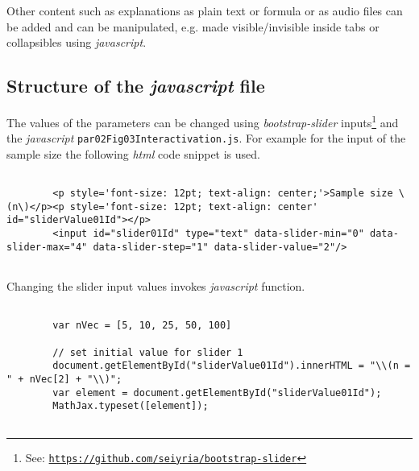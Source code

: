 \documentclass[12pt]{article}
\begin{document}
Other content such as explanations as plain text or formula or as audio files can be added and can be manipulated, e.g. made visible/invisible inside tabs or collapsibles using \emph{javascript}. 






\subsection{Structure of the \emph{javascript} file}\label{SecHowJs}

The values of the parameters can be changed using \emph{bootstrap-slider} inputs\footnote{See: \href{https://github.com/seiyria/bootstrap-slider}{\texttt{https://github.com/seiyria/bootstrap-slider}}} and the \emph{javascript} \texttt{par02Fig03Interactivation.js}. 
%
For example for the input of the sample size the following \emph{html} code snippet is used. 

\begin{CodeSnippet}[!hp]
	\centering
	\caption{\emph{Html} code snippet for \emph{bootstrap-slider} input}
	\tiny
	\vspace{0.25cm}
	\begin{BVerbatim}
		
		<p style='font-size: 12pt; text-align: center;'>Sample size \(n\)</p><p style='font-size: 12pt; text-align: center' id="sliderValue01Id"></p>
		<input id="slider01Id" type="text" data-slider-min="0" data-slider-max="4" data-slider-step="1" data-slider-value="2"/>
		
	\end{BVerbatim}
	\label{HtmlCodSniBsInput}
\end{CodeSnippet}

Changing the slider input values invokes \emph{javascript} function. 

\begin{CodeSnippet}[!hp]
	\centering
	\caption{\emph{Javascript} code snippet for interactive sliders (no 1): Initialize slider values}
	\normalsize
	\vspace{0.25cm}
	\begin{BVerbatim}
		
		var nVec = [5, 10, 25, 50, 100]
		
		// set initial value for slider 1
		document.getElementById("sliderValue01Id").innerHTML = "\\(n = " + nVec[2] + "\\)";
		var element = document.getElementById("sliderValue01Id");
		MathJax.typeset([element]);
		
	\end{BVerbatim}
	\label{JsCodSniSliInt01}
\end{CodeSnippet}
\end{document}

